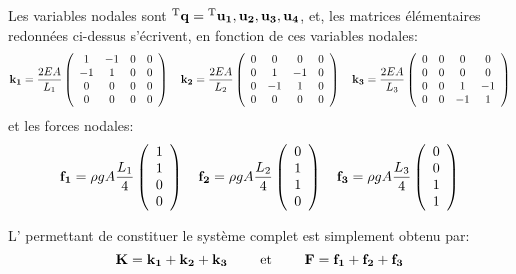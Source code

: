 \medskip
Les variables nodales sont ${}^\mathrm{T}\mathbf{q}={}^\mathrm{T}\mathbf{u_1, u_2, u_3, u_4}$, et, les matrices élémentaires
redonnées ci-dessus s'écrivent, en fonction de ces variables nodales:
\begin{equation}
\mathbf{k_1} = \frac{2EA}{L_1} \left(  \begin{array}{cccc} 1 & -1 & 0 & 0\\ -1& 1 & 0 & 0\\ 0&0&0&0\\0&0&0&0 \end{array}\right)
\quad
\mathbf{k_2} = \frac{2EA}{L_2} \left(  \begin{array}{cccc}0&0&0&0\\ 0& 1 & -1 & 0\\ 0 & -1& 1& 0\\0&0&0&0 \end{array}\right)
\quad
\mathbf{k_3} = \frac{2EA}{L_3} \left(  \begin{array}{cccc}0&0&0&0\\0&0&0&0\\0& 0& 1 & -1\\ 0&0 & -1& 1\end{array}\right)
\end{equation}
et les forces nodales:
\begin{equation}
\mathbf{f_1} = \rho g A \frac{L_1}4 \left(  \begin{array}{c} 1 \\1\\0\\0 \end{array}\right)
\quad
\mathbf{f_2} = \rho g A \frac{L_2}4 \left(  \begin{array}{c} 0\\1 \\1\\0 \end{array}\right)
\quad
\mathbf{f_3} = \rho g A \frac{L_3}4 \left(  \begin{array}{c} 0\\0\\1 \\1 \end{array}\right)
\end{equation}

\medskip
L' permettant de constituer le système complet est simplement obtenu par:
\begin{equation} \mathbf{K}=\mathbf{k_1}+\mathbf{k_2}+\mathbf{k_3} \qquad \text{ et } \qquad \mathbf{F}=\mathbf{f_1}+\mathbf{f_2}+\mathbf{f_3} \end{equation}

